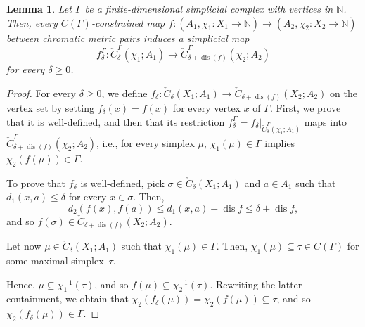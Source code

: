 \documentclass[8pt,a4paper,oneside,english,english]{article}
\theoremstyle{plain}
\theoremstyle
{plain}
\newtheorem{lemma}[theorem]{Lemma}%
\theoremstyle{definition}
\newcommand{\N}{\mathbb{N}}
\newcommand{\extMP}[1]{(A_{#1},\chi_{#1}\colon X_{#1}\to\N)}
\DeclareMathOperator{\dis}{dis}
\begin{document}
\begin{lemma}
	Let $\Gamma$ be a finite-dimensional simplicial complex with vertices in $\N$. Then, every $C(\Gamma)$-constrained map $f\colon\extMP{1}\to\extMP{2}$ between chromatic metric pairs induces a simplicial map
	\[
		f_\delta^\Gamma\colon\check{C}_\delta^\Gamma(\chi_1;A_1)\to\check{C}_{\delta+\dis(f)}^\Gamma(\chi_2;A_2)
	\]
	for every $\delta\geq 0$.
\end{lemma}
\begin{proof}
	For every $\delta\geq 0$, we define $f_\delta\colon\check{C}_\delta(X_1;A_1)\to\check{C}_{\delta+\dis(f)}(X_2;A_2)$ on the vertex set by setting $f_\delta(x)=f(x)$ for every vertex $x$ of $\Gamma$. 
    First, we prove that it is well-defined, and then that its restriction $f_\delta^\Gamma=f_\delta|_{\check{C}_\delta^\Gamma(\chi_1;A_1)}$ maps into $\check{C}^\Gamma_{\delta+\dis(f)}(\chi_2;A_2)$, i.e., for every simplex $\mu$, $\chi_1(\mu)\in\Gamma$ implies $\chi_2(f(\mu))\in\Gamma$.
	
	To prove that $f_\delta$ is well-defined, pick $\sigma\in\check{C}_\delta(X_1;A_1)$ and $a\in A_1$ such that $d_1(x,a)\leq\delta$ for every $x\in\sigma$. Then,
	\[
		d_2(f(x),f(a))\leq d_1(x,a)+\dis f\leq\delta+\dis f,
	\]
	and so $f(\sigma)\in\check{C}_{\delta+\dis(f)}(X_2;A_2)$.
	
	Let now $\mu\in\check{C}_\delta(X_1;A_1)$ such that $\chi_1(\mu)\in\Gamma$. 
    Then, $\chi_1(\mu)\subseteq \tau\in C(\Gamma)$ for some maximal simplex~$\tau$. 
    
    Hence, $\mu\subseteq \chi_1^{-1}(\tau)$, and so $f(\mu)\subseteq \chi_2^{-1}(\tau)$. Rewriting the latter containment, we obtain that $\chi_2(f_\delta(\mu))=\chi_2(f(\mu))\subseteq\tau$, and so $\chi_2(f_\delta(\mu))\in\Gamma$.
\end{proof}
\end{document}
